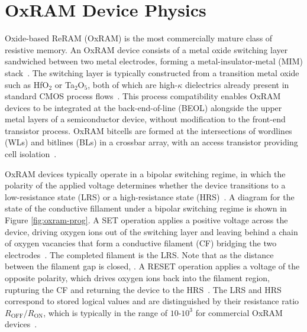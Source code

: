 \section{OxRAM Device Physics}
\label{sec:bg-oxram}

Oxide-based ReRAM (OxRAM) is the most commercially mature class of
resistive memory. An OxRAM device consists of a metal oxide switching
layer sandwiched between two metal electrodes, forming a
metal-insulator-metal (MIM) stack~\cite{wong2012metal,chen2020reram}.
The switching layer is typically constructed from a transition metal
oxide such as HfO$_2$ or Ta$_2$O$_5$, both of which are high-$\kappa$
dielectrics already present in standard CMOS process
flows~\cite{wong2012metal, chen2020reram}. This process compatibility
enables OxRAM devices to be integrated at the back-end-of-line (BEOL)
alongside the upper metal layers of a semiconductor device, without
modification to the front-end transistor process. OxRAM bitcells are
formed at the intersections of wordlines (WLs) and bitlines (BLs) in a
crossbar array, with an access transistor providing cell
isolation~\cite{wong2012metal}.



OxRAM devices typically operate in a bipolar switching regime, in which
the polarity of the applied voltage determines whether the device
transitions to a low-resistance state (LRS) or a high-resistance state
(HRS)~\cite{wong2012metal, chen2020reram}. A diagram for the state of
the conductive fillament under a bipolar switching regime is shown in
Figure \ref{fig:oxram-prog}. A SET operation applies a positive voltage
across the device, driving oxygen ions out of the switching layer and
leaving behind a chain of oxygen vacancies that form a conductive
filament (CF) bridging the two electrodes~\cite{wei2008highly,
	yu2012switching}. The completed filament is the LRS. Note that as the
distance between the filament gap is closed, . A RESET operation applies a voltage
of the opposite polarity, which drives oxygen ions back into the
filament region, rupturing the CF and returning the device to the
HRS~\cite{yu2012switching}. The LRS and HRS correspond to stored logical
values and are distinguished by their resistance ratio
$R_\text{OFF}/R_\text{ON}$, which is typically in the range of
$10$-$10^3$ for commercial OxRAM devices~\cite{chen2020reram}.

